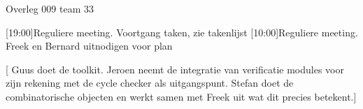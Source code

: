 \documentclass{article}
\begin{document}
\begin{Minutes}{Overleg 009 team 33}

[19:00]{Reguliere meeting. Voortgang taken, zie takenlijst}
[10:00]{Reguliere meeting. Freek en Bernard uitnodigen voor plan}




\listoftasks


[
Guus doet de toolkit. Jeroen neemt de integratie van verificatie modules
voor zijn rekening met de cycle checker als uitgangspunt. Stefan doet
de combinatorische objecten en werkt samen met Freek uit wat dit precies betekent.]


\end{Minutes}
\end{document}
